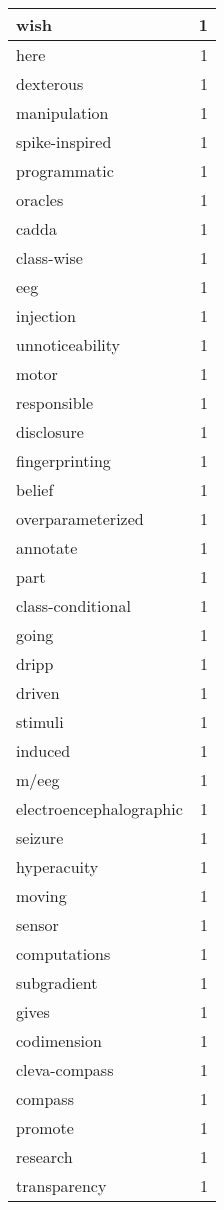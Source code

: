 \begin{table}[h]
\begin{tabular}{|l|r|}
\hline
wish & 1 \\
\hline
here & 1 \\
\hline
dexterous & 1 \\
\hline
manipulation & 1 \\
\hline
spike-inspired & 1 \\
\hline
programmatic & 1 \\
\hline
oracles & 1 \\
\hline
cadda & 1 \\
\hline
class-wise & 1 \\
\hline
eeg & 1 \\
\hline
injection & 1 \\
\hline
unnoticeability & 1 \\
\hline
motor & 1 \\
\hline
responsible & 1 \\
\hline
disclosure & 1 \\
\hline
fingerprinting & 1 \\
\hline
belief & 1 \\
\hline
overparameterized & 1 \\
\hline
annotate & 1 \\
\hline
part & 1 \\
\hline
class-conditional & 1 \\
\hline
going & 1 \\
\hline
dripp & 1 \\
\hline
driven & 1 \\
\hline
stimuli & 1 \\
\hline
induced & 1 \\
\hline
m/eeg & 1 \\
\hline
electroencephalographic & 1 \\
\hline
seizure & 1 \\
\hline
hyperacuity & 1 \\
\hline
moving & 1 \\
\hline
sensor & 1 \\
\hline
computations & 1 \\
\hline
subgradient & 1 \\
\hline
gives & 1 \\
\hline
codimension & 1 \\
\hline
cleva-compass & 1 \\
\hline
compass & 1 \\
\hline
promote & 1 \\
\hline
research & 1 \\
\hline
transparency & 1 \\

\end{tabular}
\end{table}
